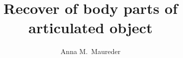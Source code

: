 \documentclass[master,english]{hgbthesis}
\title{Recover of body parts of articulated object}
\author{Anna M.\ Maureder}
\begin{document}

\frontmatter							%

\maketitle
\tableofcontents


			

\mainmatter          			%





%
%
%
%

\appendix                                         %


\MakeBibliography                        				%

%

\end{document}
